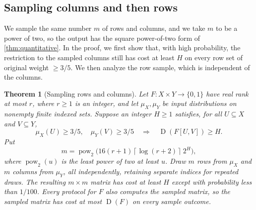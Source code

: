 \documentclass[11pt,letterpaper]{article} \usepackage[utf8]{inputenc}
\theoremstyle{plain} \newtheorem{theorem}{Theorem}[section]
\theoremstyle{definition} \newaliascnt{definition}{theorem}
\newcommand{\D}{\operatorname{D}}
\newcommand{\ceil}[1]{\left\lceil#1\right\rceil}
\begin{document}
\subsection{Sampling columns and then rows}
\label{sec:sampling}

We sample the same number $m$ of rows and columns, and we take $m$ to be a
power of two, so the output has the square power-of-two form of
\cref{thm:quantitative}. In the proof, we first show that, with high
probability, the restriction to the sampled columns still has cost at least $H$ on every
row set of original weight $\ge3/5$. We then analyze the row sample, which is independent of the columns.

\begin{theorem}[Sampling rows and columns]\label{thm:compression}
Let $F:X\times Y\to\{0,1\}$ have real rank at most $r$, where $r\ge1$ is an
integer, and let $\mu_X,\mu_Y$ be input distributions on nonempty finite indexed sets.
Suppose an integer $H\ge1$ satisfies, for all $U\subseteq X$ and $V\subseteq Y$,
\[
\mu_X(U)\ge3/5,\quad\mu_Y(V)\ge3/5
\quad\Longrightarrow\quad \D(F[U,V])\ge H.
\]
Put
\[
m=\operatorname{pow}_2\bigl(16(r+1)\ceil{\log(r+2)}\,2^H\bigr),
\]
where $\operatorname{pow}_2(u)$ is the least power of two at least $u$.
Draw $m$ rows from $\mu_X$ and $m$ columns from $\mu_Y$, all independently, retaining separate indices for
repeated draws. The resulting $m\times m$ matrix has cost at least $H$ except
with probability less than $1/100$. Every protocol for $F$ also computes the
sampled matrix, so the sampled matrix has cost at most $\D(F)$ on every sample outcome.
\end{theorem}
\end{document}
